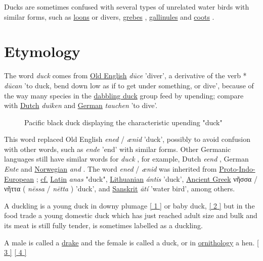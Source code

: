 \documentclass[11pt,a4paper]{article}
\begin{document}
Ducks are sometimes confused with several types of unrelated water birds with similar forms, such as \href{/wiki/Loon}{loons} or divers, \href{/wiki/Grebe}{grebes} , \href{/wiki/Gallinule}{gallinules} and \href{/wiki/Coot}{coots} .

\section{Etymology}

The word \textit{duck} comes from \href{/wiki/Old\_English}{Old English} \textit{dūce} 'diver', a derivative of the verb * \textit{dūcan} 'to duck, bend down low as if to get under something, or dive', because of the way many species in the \href{/wiki/Dabbling\_duck}{dabbling duck} group feed by upending; compare with \href{/wiki/Dutch\_language}{Dutch} \textit{duiken} and \href{/wiki/German\_language}{German} \textit{tauchen} 'to dive'.

\begin{figure}[h]
\caption{Pacific black duck displaying the characteristic upending "duck"}
\end{figure}

This word replaced Old English \textit{ened} / \textit{ænid} 'duck', possibly to avoid confusion with other words, such as \textit{ende} 'end' with similar forms. Other Germanic languages still have similar words for \textit{duck} , for example, Dutch \textit{eend} , German \textit{Ente} and \href{/wiki/Norwegian\_language}{Norwegian} \textit{and} . The word \textit{ened} / \textit{ænid} was inherited from \href{/wiki/Proto-Indo-European\_language}{Proto-Indo-European} ; \href{/wiki/Cf.}{cf.} \href{/wiki/Latin}{Latin} \textit{anas} "duck", \href{/wiki/Lithuanian\_language}{Lithuanian} \textit{ántis} 'duck', \href{/wiki/Ancient\_Greek\_language}{Ancient Greek} νῆσσα / νῆττα ( \textit{nēssa} / \textit{nētta} ) 'duck', and \href{/wiki/Sanskrit}{Sanskrit} \textit{ātí} 'water bird', among others.

A duckling is a young duck in downy plumage \href{\#cite\_note-1}{[ 1 ]} or baby duck, \href{\#cite\_note-2}{[ 2 ]} but in the food trade a young domestic duck which has just reached adult size and bulk and its meat is still fully tender, is sometimes labelled as a duckling.

A male is called a \href{https://en.wiktionary.org/wiki/drake}{drake} and the female is called a duck, or in \href{/wiki/Ornithology}{ornithology} a hen. \href{\#cite\_note-3}{[ 3 ]} \href{\#cite\_note-4}{[ 4 ]}
\end{document}
